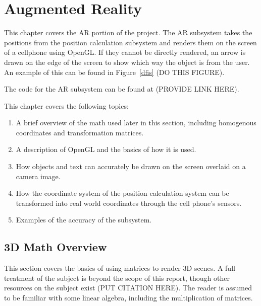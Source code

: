 
\chapter{Augmented Reality} %

\label{AugmentedReality}


This chapter covers the AR portion of the project. The AR subsystem takes the positions from the position calculation subsystem and renders them on the screen of a cellphone using OpenGL. If they cannot be directly rendered, an arrow is drawn on the edge of the screen to show which way the object is from the user. An example of this can be found in Figure~\ref{dfis} (DO THIS FIGURE).

The code for the AR subsystem can be found at (PROVIDE LINK HERE).

This chapter covers the following topics:
\begin{enumerate}
	\item A brief overview of the math used later in this section, including homogenous coordinates and transformation matrices.
	\item A description of OpenGL and the basics of how it is used. 
	\item How objects and text can accurately be drawn on the screen overlaid on a camera image.
	\item How the coordinate system of the position calculation system can be transformed into real world coordinates through the cell phone's sensors.
	\item Examples of the accuracy of the subsystem.
\end{enumerate}

\section{3D Math Overview}
This section covers the basics of using matrices to render 3D scenes. A full treatment of the subject is beyond the scope of this report, though other resources on the subject exist (PUT CITATION HERE). The reader is assumed to be familiar with some linear algebra, including the multiplication of matrices. 

